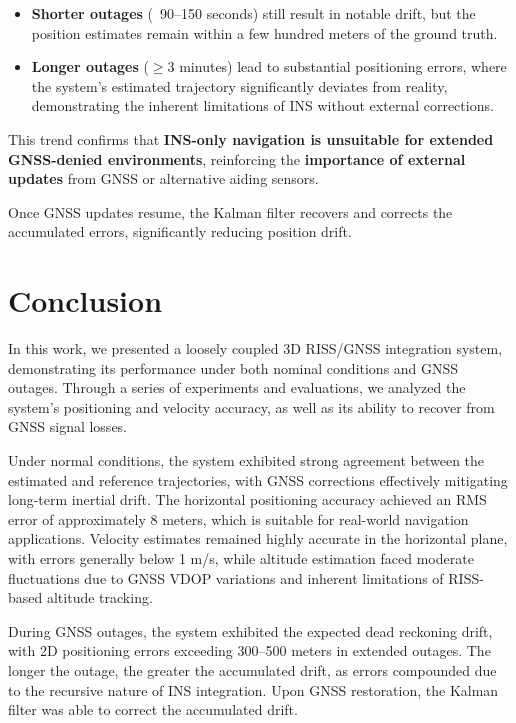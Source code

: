 \documentclass[conference]{IEEEtran}
\begin{document}
\begin{itemize}
    \item \textbf{Shorter outages} (~90–150 seconds) still result in notable drift, but the position estimates remain within a few hundred meters of the ground truth.
    \item \textbf{Longer outages} (\(\geq 3\) minutes) lead to substantial positioning errors, where the system's estimated trajectory significantly deviates from reality, demonstrating the inherent limitations of INS without external corrections.
\end{itemize}

This trend confirms that \textbf{INS-only navigation is unsuitable for extended GNSS-denied environments}, reinforcing the \textbf{importance of external updates} from GNSS or alternative aiding sensors.

Once GNSS updates resume, the Kalman filter recovers and corrects the accumulated errors, significantly reducing position drift. 

\section{Conclusion}

In this work, we presented a loosely coupled 3D RISS/GNSS integration system, demonstrating its performance under both nominal conditions and GNSS outages. Through a series of experiments and evaluations, we analyzed the system's positioning and velocity accuracy, as well as its ability to recover from GNSS signal losses.

Under normal conditions, the system exhibited strong agreement between the estimated and reference trajectories, with GNSS corrections effectively mitigating long-term inertial drift. The horizontal positioning accuracy achieved an RMS error of approximately 8 meters, which is suitable for real-world navigation applications. Velocity estimates remained highly accurate in the horizontal plane, with errors generally below 1 m/s, while altitude estimation faced moderate fluctuations due to GNSS VDOP variations and inherent limitations of RISS-based altitude tracking.

During GNSS outages, the system exhibited the expected dead reckoning drift, with 2D positioning errors exceeding 300–500 meters in extended outages. The longer the outage, the greater the accumulated drift, as errors compounded due to the recursive nature of INS integration. Upon GNSS restoration, the Kalman filter was able to correct the accumulated drift.
\end{document}
